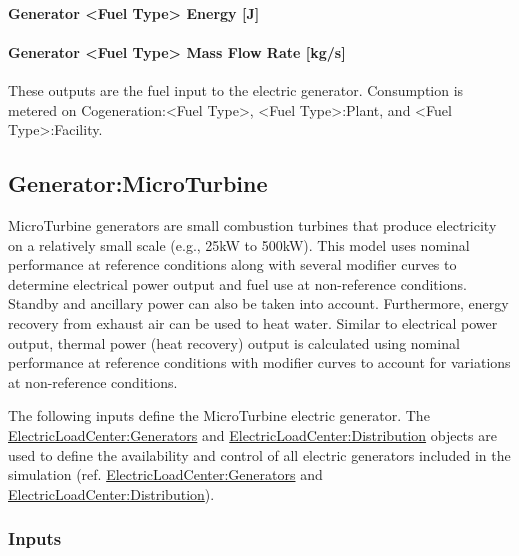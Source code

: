 \paragraph{Generator \textless{}Fuel Type\textgreater{} Energy {[}J{]}}\label{generator-fuel-type-energy-j-1}

\paragraph{Generator \textless{}Fuel Type\textgreater{} Mass Flow Rate {[}kg/s{]}}\label{generator-fuel-type-mass-flow-rate-kgs-1}

These outputs are the fuel input to the electric generator. Consumption is metered on Cogeneration:\textless{}Fuel Type\textgreater{}, \textless{}Fuel Type\textgreater{}:Plant, and \textless{}Fuel Type\textgreater{}:Facility.

\subsection{Generator:MicroTurbine}\label{generatormicroturbine}

MicroTurbine generators are small combustion turbines that produce electricity on a relatively small scale (e.g., 25kW to 500kW). This model uses nominal performance at reference conditions along with several modifier curves to determine electrical power output and fuel use at non-reference conditions. Standby and ancillary power can also be taken into account. Furthermore, energy recovery from exhaust air can be used to heat water. Similar to electrical power output, thermal power (heat recovery) output is calculated using nominal performance at reference conditions with modifier curves to account for variations at non-reference conditions.

The following inputs define the MicroTurbine electric generator. The \hyperref[electricloadcentergenerators]{ElectricLoadCenter:Generators} and \hyperref[electricloadcenterdistribution]{ElectricLoadCenter:Distribution} objects are used to define the availability and control of all electric generators included in the simulation (ref. \hyperref[electricloadcentergenerators]{ElectricLoadCenter:Generators} and \hyperref[electricloadcenterdistribution]{ElectricLoadCenter:Distribution}).

\subsubsection{Inputs}\label{inputs-9-004}

